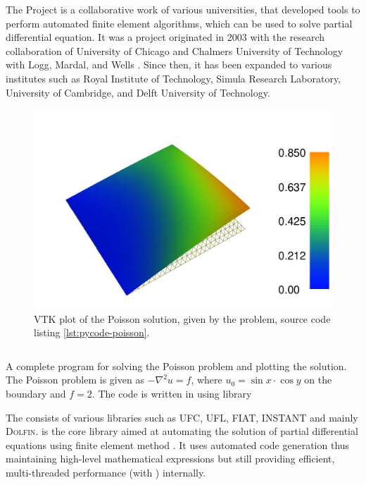 The \fenics Project is a collaborative work of various universities, that developed tools to perform automated finite element algorithms, which can be used to solve partial differential equation. It was a project originated in 2003 with the research collaboration of University of Chicago and Chalmers University of Technology with Logg,  Mardal, and Wells \cite{Logg2012b}. Since then, it has been expanded to various institutes such as Royal Institute of Technology, Simula Research Laboratory, University of Cambridge, and Delft University of Technology.

	\begin{figure}[p]
	\centering
	\includegraphics[width=0.5\linewidth]{./figures/eulerian/dolfinExampleFigure-rotated270.pdf}
	\caption{\dolfin VTK plot of the Poisson solution, given by the problem, source code listing \ref{lst:pycode-poisson}.}
	\label{fig:dolfinExampleFigure}
	\end{figure}

	\begin{listing}[p]
	\inputminted[fontseries=courier,obeytabs,fontsize=\footnotesize,mathescape,linenos,numbersep=5pt,frame=lines,framesep=2mm,xleftmargin=20mm,xrightmargin=20mm]{python}{figures/eulerian/dolfinExample.py}
	\caption{A complete program for solving the Poisson problem and plotting the solution. The Poisson problem is given as $-\nabla^2{u} = f$, where $u_0 = \sin{x}\cdot\cos{y}$ on the boundary and $f=2$. The code is written in \python using  library}
	\label{lst:pycode-poisson}
	\end{listing}

The consists of various libraries such as UFC, UFL, FIAT, INSTANT and mainly \textsc{Dolfin}. \dolfin is the core library aimed at automating the solution of partial differential equations using finite element method \cite{Logg2010a}. It uses automated code generation thus maintaining high-level mathematical expressions but still providing efficient, multi-threaded performance (with ) internally. %

